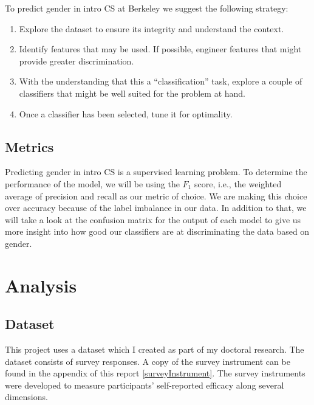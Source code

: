 To predict gender in intro CS at Berkeley we suggest the following strategy:
\begin{enumerate}%
\item Explore the dataset to ensure its integrity and understand the context.
\item Identify features that may be used. If possible, engineer features that might provide greater discrimination.
\item With the understanding that this a ``classification'' task, explore a couple of classifiers that might be well suited for the problem at hand.
\item Once a classifier has been selected, tune it for optimality.
\end{enumerate}

\section*{Metrics}


Predicting gender in intro CS is a supervised learning problem. To determine the performance of the model, we will be using the $F_1$ score, i.e., the weighted average of precision and recall as our metric of choice. We are making this choice over accuracy because of the label imbalance in our data. In addition to that, we will take a look at the confusion matrix for the output of each model to give us more insight into how good our classifiers are at discriminating the data based on gender. 


\chapter*{Analysis}

\section* {Dataset}
This project uses a dataset which I created as part of my doctoral research. The dataset consists of survey responses. A copy of the survey instrument can be found in the appendix of this report \ref{surveyInstrument}. The survey instruments were developed to measure participants' self-reported efficacy along several dimensions. 

